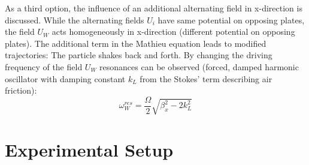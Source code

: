 \documentclass[
	paper=A4,
	parskip=full,
	chapterprefix=true,
	11pt,
	headings=normal,
	bibliography=totoc,
	listof=totoc,
	titlepage=on,
]{scrreprt}
\begin{document}
As a third option, the influence of an additional alternating field in x-direction is discussed. While the alternating fields $U_i$ have same potential on opposing plates, the field $U_W$ acts homogeneously in x-direction (different potential on opposing plates). The additional term in the Mathieu equation leads to modified trajectories: The particle shakes back and forth. By changing the driving frequency of the field $U_W$ resonances can be observed (forced, damped harmonic oscillator with damping constant $k_L$ from the Stokes' term describing air friction):
\begin{equation}
\omega_W^{res} = \frac{\Omega}{2} \sqrt{\beta_x^2 - 2 k_L^2}
\end{equation}


\chapter{Experimental Setup}
\end{document}
